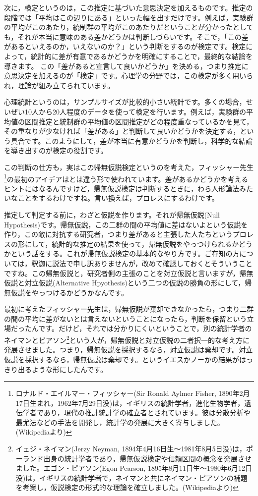 \documentclass{ltjsbook}
\begin{document}
次に，検定というのは，この推定に基づいた意思決定を加えるものです。推定の段階では「平均はこの辺りにある」といった幅を出すだけです。例えば，実験群の平均がこのあたり，統制群の平均がこのあたりだということが分かったとしても，それが本当に意味のある差かどうかは判断しづらいです。そこで，「この差があるといえるのか，いえないのか？」という判断をするのが検定です。検定によって，統計的に差が有意であるかどうかを明確にすることで，最終的な結論を導きます。
この「差があると宣言して良いかどうか」を決める，つまり推定に意思決定を加えるのが「検定」です。心理学の分野では，この検定が多く用いられ，理論が組み立てられています。

心理統計というのは，サンプルサイズが比較的小さい統計です。多くの場合，せいぜい10人から20人程度のデータを使って検定を行います。例えば，実験群の平均値の区間推定と統制群の平均値の区間推定がどの程度重なっているかを見て，その重なりが少なければ「差がある」と判断して良いかどうかを決定する，という具合です。このようにして，差が本当に有意かどうかを判断し，科学的な結論を導き出すのが検定の役割です。

この判断の仕方も，実はこの帰無仮説検定というのを考えた，フィッシャー先生\footnote{ロナルド・エイルマー・フィッシャー(Sir Ronald Aylmer Fisher, 1890年2月17日生まれ，1962年7月29日没)は，イギリスの統計学者，進化生物学者，遺伝学者であり，現代の推計統計学の確立者とされています。彼は分散分析や最尤法などの手法を開発し，統計学の発展に大きく寄与しました。(Wikipediaより)}の最初のアイデアはとは違う形で使われています。差があるかどうかを考えるヒントにはなるんですけど，帰無仮説検定は判断するときに，わら人形論法みたいなことをするわけですね。言い換えば，プロレスにするわけです。

推定して判定する前に，わざと仮説を作ります。それが帰無仮説(Null Hypothesis)です。帰無仮説，この二群の間の平均値に差はないよという仮説を作り，この敵に対抗する研究者，つまり差があると主張した人たちというプロレスの形にして，統計的な推定の結果を使って，帰無仮説をやっつけられるかどうかという話をする。これが帰無仮説検定の基本的なやり方です。ご存知の方については，釈迦に説法で申し訳ありませんが，改めて確認しておくとそういうことですね。この帰無仮説と，研究者側の主張のことを対立仮説と言いますが，帰無仮説と対立仮説(Alternative Hpyothesis)という二つの仮説の勝負の形にして，帰無仮説をやっつけるかどうかなんです。

最初に考えたフィッシャー先生は，帰無仮説が棄却できなかったら，つまり二群の間の平均に差がないとは言えないということになったら，判断を保留という立場だったんです。だけど，それでは分かりにくいということで，別の統計学者のネイマンとピアソン\footnote{イェジ・ネイマン(Jerzy Neyman, 1894年4月16日生～1981年8月5日没)は，ポーランド出身の統計学者であり，帰無仮説検定や信頼区間の概念を発展させました。エゴン・ピアソン(Egon Pearson, 1895年8月11日生～1980年6月12日没)は，イギリスの統計学者で，ネイマンと共にネイマン・ピアソンの補題を考案し，仮説検定の形式的な理論を確立しました。(Wikipediaより)}という人が，帰無仮説と対立仮説の二者択一的な考え方に発展させました。つまり，帰無仮説を採択するなら，対立仮説は棄却です。対立仮説を採択するなら，帰無仮説は棄却です。というイエスかノーかの結果がはっきり出るような形にしたんです。
\end{document}

